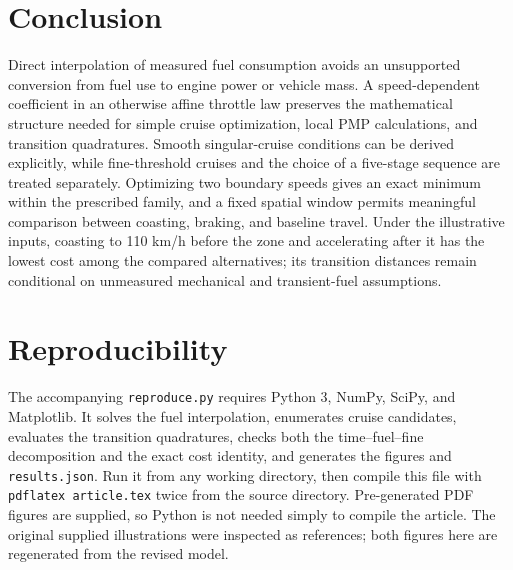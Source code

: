\documentclass[10pt,a4paper]{article}
\begin{document}
\section{Conclusion}
Direct interpolation of measured fuel consumption avoids an unsupported conversion from fuel use to engine power or vehicle mass. A speed-dependent coefficient in an otherwise affine throttle law preserves the mathematical structure needed for simple cruise optimization, local PMP calculations, and transition quadratures. Smooth singular-cruise conditions can be derived explicitly, while fine-threshold cruises and the choice of a five-stage sequence are treated separately. Optimizing two boundary speeds gives an exact minimum within the prescribed family, and a fixed spatial window permits meaningful comparison between coasting, braking, and baseline travel. Under the illustrative inputs, coasting to 110 km/h before the zone and accelerating after it has the lowest cost among the compared alternatives; its transition distances remain conditional on unmeasured mechanical and transient-fuel assumptions.

\appendix
\section{Reproducibility}
The accompanying \texttt{reproduce.py} requires Python 3, NumPy, SciPy, and Matplotlib. It solves the fuel interpolation, enumerates cruise candidates, evaluates the transition quadratures, checks both the time--fuel--fine decomposition and the exact cost identity, and generates the figures and \texttt{results.json}. Run it from any working directory, then compile this file with \texttt{pdflatex article.tex} twice from the source directory. Pre-generated PDF figures are supplied, so Python is not needed simply to compile the article. The original supplied illustrations were inspected as references; both figures here are regenerated from the revised model.
\end{document}

